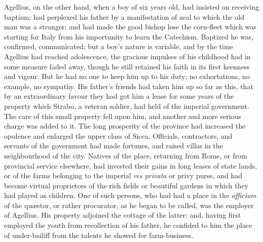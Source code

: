 Agellius, on the other hand, when a boy of six years old, had
insisted on receiving baptism; had perplexed his father by a
manifestation of zeal to which the old man was a stranger; and had
made the good bishop lose the corn-fleet which was starting for Italy
from his importunity to learn the Catechism. Baptized he was,
confirmed, communicated; but a boy's nature is variable, and by the
time Agellius had reached adolescence, the gracious impulses of his
childhood had in some measure faded away, though he still retained his
faith in its first keenness and vigour. But he had no one to keep him
up to his duty; no exhortations, no example, no sympathy. His father's
friends had taken him up so far as this, that by an extraordinary
favour they had got him a lease for some years of the property
which Strabo, a veteran soldier, had held of the imperial government.
The care of this small property fell upon him, and another and more
serious charge was added to it. The long prosperity of the province
had increased the opulence and enlarged the upper class of Sicca.
Officials, contractors, and servants of the government had made
fortunes, and raised villas in the neighbourhood of the city. Natives
of the place, returning from Rome, or from provincial service
elsewhere, had invested their gains in long leases of state lands, or
of the farms belonging to the imperial \emph{res privata} or privy
purse, and had become virtual proprietors of the rich fields or
beautiful gardens in which they had played as children. One of such
persons, who had had a place in the \emph{officium} of the quæstor,
or rather procurator, as he began to be called, was the employer of
Agellius. His property adjoined the cottage of the latter; and, having
first employed the youth from recollection of his father, he confided
to him the place of under-bailiff from the talents he showed for
farm-business.

